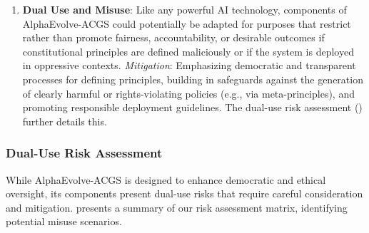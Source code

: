 \documentclass[manuscript,screen,review,anonymous,9pt]{acmart}
\begin{document}
\begin{enumerate}[leftmargin=*,itemsep=1pt,parsep=1pt]
    \item \textbf{Dual Use and Misuse}: Like any powerful AI technology, components of AlphaEvolve-ACGS could potentially be adapted for purposes that restrict rather than promote fairness, accountability, or desirable outcomes if constitutional principles are defined maliciously or if the system is deployed in oppressive contexts.
        \textit{Mitigation}: Emphasizing democratic and transparent processes for defining principles, building in safeguards against the generation of clearly harmful or rights-violating policies (e.g., via meta-principles), and promoting responsible deployment guidelines. The dual-use risk assessment () further details this.
\end{enumerate}

\subsubsection{Dual-Use Risk Assessment}
\label{subsubsec:dual_use_risks}
While AlphaEvolve-ACGS is designed to enhance democratic and ethical oversight, its components present dual-use risks that require careful consideration and mitigation.  presents a summary of our risk assessment matrix, identifying potential misuse scenarios.
\end{document}
